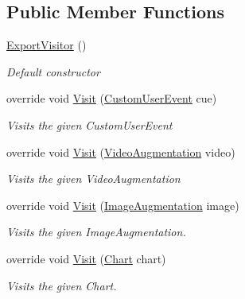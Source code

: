 \subsection*{Public Member Functions}
\begin{DoxyCompactItemize}
\item 
\hyperlink{class_a_rdev_kit_1_1_controller_1_1_project_controller_1_1_export_visitor_a1e1a8bc6cbba6dca7ade01cec777b4c5}{Export\-Visitor} ()
\begin{DoxyCompactList}\small\item\em Default constructor \end{DoxyCompactList}\item 
override void \hyperlink{class_a_rdev_kit_1_1_controller_1_1_project_controller_1_1_export_visitor_a4d2802913e6ccb1a24e53c642d1b1cff}{Visit} (\hyperlink{class_a_rdev_kit_1_1_model_1_1_project_1_1_custom_user_event}{Custom\-User\-Event} cue)
\begin{DoxyCompactList}\small\item\em Visits the given Custom\-User\-Event \end{DoxyCompactList}\item 
override void \hyperlink{class_a_rdev_kit_1_1_controller_1_1_project_controller_1_1_export_visitor_a190039e5dd86df278c99cfacedac3b63}{Visit} (\hyperlink{class_a_rdev_kit_1_1_model_1_1_project_1_1_video_augmentation}{Video\-Augmentation} video)
\begin{DoxyCompactList}\small\item\em Visits the given Video\-Augmentation \end{DoxyCompactList}\item 
override void \hyperlink{class_a_rdev_kit_1_1_controller_1_1_project_controller_1_1_export_visitor_a68256626e59d84b43153e95697ed1e3a}{Visit} (\hyperlink{class_a_rdev_kit_1_1_model_1_1_project_1_1_image_augmentation}{Image\-Augmentation} image)
\begin{DoxyCompactList}\small\item\em Visits the given Image\-Augmentation. \end{DoxyCompactList}\item 
override void \hyperlink{class_a_rdev_kit_1_1_controller_1_1_project_controller_1_1_export_visitor_a0e04a0743609a16eb7c872427755249e}{Visit} (\hyperlink{class_a_rdev_kit_1_1_model_1_1_project_1_1_chart}{Chart} chart)
\begin{DoxyCompactList}\small\item\em Visits the given Chart. \end{DoxyCompactList}\item 

\end{DoxyCompactItemize}
